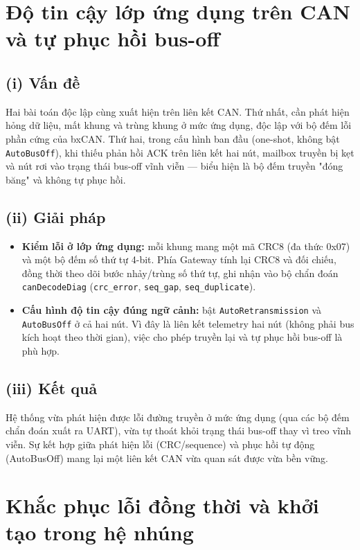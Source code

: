 \documentclass[../DoAn.tex]{subfiles}
\begin{document}
\section{Độ tin cậy lớp ứng dụng trên CAN và tự phục hồi bus-off}
\label{section:5.3}

\subsection*{(i) Vấn đề}
Hai bài toán độc lập cùng xuất hiện trên liên kết CAN. Thứ nhất, cần phát hiện
hỏng dữ liệu, mất khung và trùng khung ở mức ứng dụng, độc lập với bộ đếm lỗi
phần cứng của bxCAN. Thứ hai, trong cấu hình ban đầu (one-shot, không bật
\texttt{AutoBusOff}), khi thiếu phản hồi ACK trên liên kết hai nút, mailbox truyền
bị kẹt và nút rơi vào trạng thái bus-off vĩnh viễn — biểu hiện là bộ đếm truyền
"đóng băng" và không tự phục hồi.

\subsection*{(ii) Giải pháp}
\begin{itemize}
  \item \textbf{Kiểm lỗi ở lớp ứng dụng:} mỗi khung mang một mã CRC8 (đa thức
    0x07) và một bộ đếm số thứ tự 4-bit. Phía Gateway tính lại CRC8 và đối chiếu,
    đồng thời theo dõi bước nhảy/trùng số thứ tự, ghi nhận vào bộ chẩn đoán
    \texttt{canDecodeDiag} (\texttt{crc\_error}, \texttt{seq\_gap},
    \texttt{seq\_duplicate}).
  \item \textbf{Cấu hình độ tin cậy đúng ngữ cảnh:} bật
    \texttt{AutoRetransmission} và \texttt{AutoBusOff} ở cả hai nút. Vì đây là
    liên kết telemetry hai nút (không phải bus kích hoạt theo thời gian), việc cho
    phép truyền lại và tự phục hồi bus-off là phù hợp.
\end{itemize}

\subsection*{(iii) Kết quả}
Hệ thống vừa phát hiện được lỗi đường truyền ở mức ứng dụng (qua các bộ đếm chẩn
đoán xuất ra UART), vừa tự thoát khỏi trạng thái bus-off thay vì treo vĩnh viễn.
Sự kết hợp giữa phát hiện lỗi (CRC/sequence) và phục hồi tự động (AutoBusOff)
mang lại một liên kết CAN vừa quan sát được vừa bền vững.

\section{Khắc phục lỗi đồng thời và khởi tạo trong hệ nhúng}
\label{section:5.4}
\end{document}
